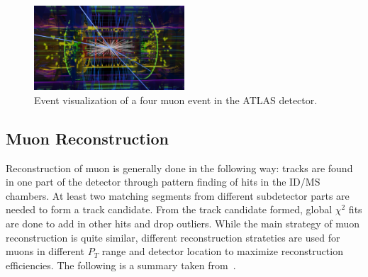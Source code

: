 \begin{figure}[!htb]
    \begin{center}
        \includegraphics[width=0.5\textwidth]{figures/common_ana/Muon}
        \caption{        
            Event visualization of a four muon event in the ATLAS detector\cite{ATLAS:1697053}.
        }
        \label{fig:muon}
    \end{center}
\end{figure}



\subsection{Muon Reconstruction}
Reconstruction of muon is generally done in the following way: tracks are found in one part of the detector through pattern finding of hits in the ID/MS chambers. At least two matching segments from different subdetector parts are needed to form a track candidate. From the track candidate formed, global $\chi^{2}$ fits are done to add in other hits and drop outliers. While the main strategy of muon reconstruction is quite similar, different reconstruction strateties are used for muons in
different $P_{T}$ range and detector location to maximize reconstruction efficiencies. The following is a summary taken from~\cite{muonReco2016}.

